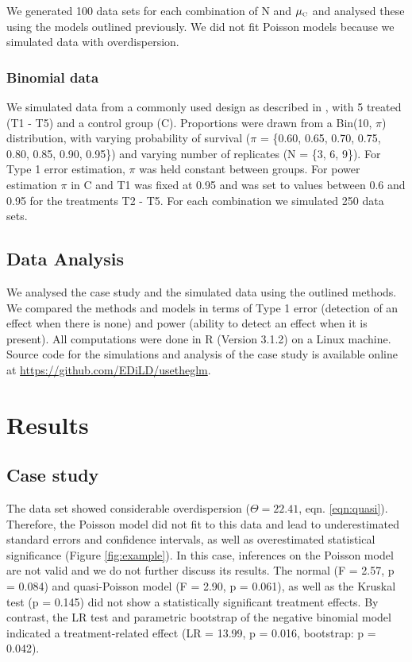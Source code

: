 \documentclass[twocolumn, natbib]{svjour3}
\begin{document}
We generated 100 data sets for each combination of N and $\mu_\text{\tiny C}$ and analysed these using the models outlined previously.
We did not fit Poisson models because we simulated data with overdispersion.


\subsubsection{Binomial data}
We simulated data from a commonly used design as described in \citet{weber_short-term_1989}, with 5 treated (T1 - T5) and a control group (C). 
Proportions were drawn from a Bin(10, $\pi$) distribution, with varying probability of survival ($\pi$ = \{0.60, 0.65, 0.70, 0.75, 0.80, 0.85, 0.90, 0.95\}) and varying number of replicates (N = \{3, 6, 9\}).
For Type 1 error estimation, $\pi$ was held constant between groups.
For power estimation $\pi$ in C and T1 was fixed at 0.95 and was set to values between 0.6 and 0.95 for the treatments T2 - T5. 
For each combination we simulated 250 data sets. 

\subsection{Data Analysis}
We analysed the case study and the simulated data using the outlined methods.
We compared the methods and models in terms of Type 1 error (detection of an effect when there is none) and power (ability to detect an effect when it is present).
All computations were done in R (Version 3.1.2) \citep{r_core_team_r:_2014} on a Linux machine.
Source code for the simulations and analysis of the case study is available online at \url{https://github.com/EDiLD/usetheglm}.



\section{Results}
\label{sec:results}
\subsection{Case study}
The data set showed considerable overdispersion ($\Theta = 22.41$, eqn. \ref{eqn:quasi}).
Therefore, the Poisson model did not fit to this data and lead to underestimated standard errors and confidence intervals, as well as overestimated statistical significance (Figure \ref{fig:example}).
In this case, inferences on the Poisson model are not valid and we do not further discuss its results.
The normal (F = 2.57, p = 0.084) and quasi-Poisson model (F = 2.90, p = 0.061), as well as the Kruskal test (p =  0.145) did not show a statistically significant treatment effects.
By contrast, the LR test and parametric bootstrap of the negative binomial model indicated a treatment-related effect (LR = 13.99, p = 0.016, bootstrap: p = 0.042).
\end{document}

